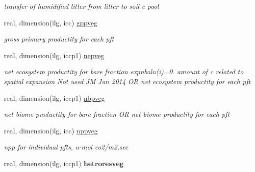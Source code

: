 \begin{DoxyCompactItemize}
\begin{DoxyCompactList}\small\item\em transfer of humidified litter from litter to soil c pool \end{DoxyCompactList}\item 
\hypertarget{structctem__statevars_1_1veg__gat_a591d47bd50185af4c1b625cc976162f3}{}real, dimension(ilg, icc) \hyperlink{structctem__statevars_1_1veg__gat_a591d47bd50185af4c1b625cc976162f3}{gppveg}\label{structctem__statevars_1_1veg__gat_a591d47bd50185af4c1b625cc976162f3}

\begin{DoxyCompactList}\small\item\em gross primary productity for each pft \end{DoxyCompactList}\item 
\hypertarget{structctem__statevars_1_1veg__gat_afca62bde55e84abec322cece5c965fb7}{}real, dimension(ilg, iccp1) \hyperlink{structctem__statevars_1_1veg__gat_afca62bde55e84abec322cece5c965fb7}{nepveg}\label{structctem__statevars_1_1veg__gat_afca62bde55e84abec322cece5c965fb7}

\begin{DoxyCompactList}\small\item\em net ecosystem productity for bare fraction expnbaln(i)=0. amount of c related to spatial expansion Not used J\+M Jun 2014 O\+R net ecosystem productity for each pft \end{DoxyCompactList}\item 
\hypertarget{structctem__statevars_1_1veg__gat_a7d3b547d72b26a9e5c89cb64262ea269}{}real, dimension(ilg, iccp1) \hyperlink{structctem__statevars_1_1veg__gat_a7d3b547d72b26a9e5c89cb64262ea269}{nbpveg}\label{structctem__statevars_1_1veg__gat_a7d3b547d72b26a9e5c89cb64262ea269}

\begin{DoxyCompactList}\small\item\em net biome productity for bare fraction O\+R net biome productity for each pft \end{DoxyCompactList}\item 
\hypertarget{structctem__statevars_1_1veg__gat_aa61a73dccf247c53360e423c89d884c4}{}real, dimension(ilg, icc) \hyperlink{structctem__statevars_1_1veg__gat_aa61a73dccf247c53360e423c89d884c4}{nppveg}\label{structctem__statevars_1_1veg__gat_aa61a73dccf247c53360e423c89d884c4}

\begin{DoxyCompactList}\small\item\em npp for individual pfts, u-\/mol co2/m2.\+sec \end{DoxyCompactList}\item 
\hypertarget{structctem__statevars_1_1veg__gat_a2921670a3d2139eec90824225856000d}{}real, dimension(ilg, iccp1) {\bfseries hetroresveg}\label{structctem__statevars_1_1veg__gat_a2921670a3d2139eec90824225856000d}


\end{DoxyCompactItemize}
